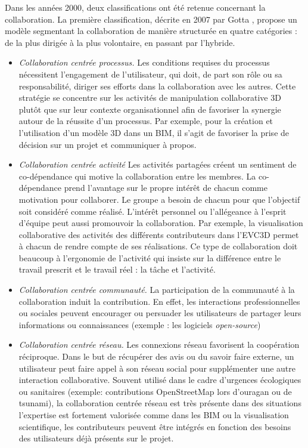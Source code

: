 Dans les années 2000, deux classifications ont été retenue concernant la 
collaboration.
La première classification, décrite en 2007 par Gotta \cite{Gotta2007}, propose 
un modèle segmentant la collaboration de manière structurée en quatre catégories 
: de la plus dirigée à la plus volontaire, en passant par l'hybride.
\begin{itemize}
	\item \textit{Collaboration centrée processus.} Les conditions requises du 
	processus 
	nécessitent l'engagement de l'utilisateur, qui doit, de part son rôle ou sa 
	responsabilité, diriger ses efforts dans la collaboration avec les autres. Cette 
	stratégie se concentre sur les activités de manipulation collaborative 3D plutôt 
	que sur leur contexte organisationnel afin de favoriser la synergie autour de la 
	réussite d'un processus. Par exemple, pour la création et l'utilisation d'un 
	modèle 	3D dans un \gls{BIM}, il s'agit de favoriser la prise de décision sur un 
	projet et 	communiquer à propos.
	
	\item \textit{Collaboration centrée activité}
	Les activités partagées créent un sentiment de co-dé\-pendance qui motive la 
	collaboration entre les membres. La co-dépendance prend l'avantage sur le 
	propre intérêt de chacun comme motivation pour collaborer. Le groupe a besoin 
	de chacun pour que l'objectif soit considéré comme réalisé. L'intérêt personnel 
	ou l'allégeance à l'esprit d'équipe peut aussi promouvoir la collaboration. Par 
	exemple, la visualisation collaborative des activités des différents contributeurs 
	dans l'\gls{EVC3D} permet à chacun de rendre compte de ses réalisations. Ce 
	type de collaboration doit beaucoup à l'ergonomie de l'activité qui insiste sur la 
	différence entre le travail prescrit et le travail réel : la tâche et l'activité.
	
	\item \textit{Collaboration centrée communauté.}
	La participation de la communauté à la collaboration induit la contribution. En 
	effet, les interactions professionnelles ou sociales peuvent encourager ou 
	persuader les utilisateurs de partager leurs informations ou connaissances 
	(exemple : les logiciels \textit{open-source})
	
	\item \textit{Collaboration centrée réseau.}
	Les connexions réseau favorisent la coopération réciproque. Dans le but de 
	récupérer des avis ou du savoir faire externe, un utilisateur peut faire appel à 
	son réseau social pour supplémenter une autre interaction collaborative. 
	Souvent utilisé dans le cadre d'urgences écologiques ou sanitaires (exemple: 
	contributions OpenStreetMap lors d'ouragan ou de tsunami), la collaboration 
	centrée réseau est très présente dans des situations l'expertise est fortement 
	valorisée comme dans les \gls{BIM} ou la visualisation scientifique, les 
	contributeurs peuvent être intégrés en fonction des besoins des utilisateurs déjà 
	présents sur le projet.
\end{itemize}
